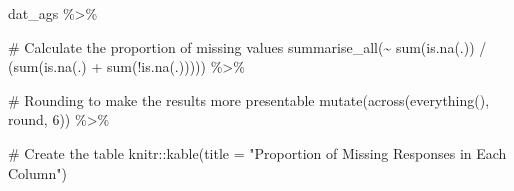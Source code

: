 \documentclass[
  letterpaper,
  DIV=11,
  numbers=noendperiod]{scrreprt}
\newenvironment{Shaded}{\begin{snugshade}}{\end{snugshade}}
\newcommand{\AttributeTok}[1]{\textcolor[rgb]{0.40,0.45,0.13}{#1}}
\newcommand{\CommentTok}[1]{\textcolor[rgb]{0.37,0.37,0.37}{#1}}
\newcommand{\DecValTok}[1]{\textcolor[rgb]{0.68,0.00,0.00}{#1}}
\newcommand{\FunctionTok}[1]{\textcolor[rgb]{0.28,0.35,0.67}{#1}}
\newcommand{\NormalTok}[1]{\textcolor[rgb]{0.00,0.23,0.31}{#1}}
\newcommand{\SpecialCharTok}[1]{\textcolor[rgb]{0.37,0.37,0.37}{#1}}
\newcommand{\StringTok}[1]{\textcolor[rgb]{0.13,0.47,0.30}{#1}}
\begin{document}
\begin{Shaded}
\begin{Highlighting}[]
\NormalTok{dat\_ags }\SpecialCharTok{\%\textgreater{}\%} 
  
  \CommentTok{\# Calculate the proportion of missing values }
  \FunctionTok{summarise\_all}\NormalTok{(}\SpecialCharTok{\textasciitilde{}} \FunctionTok{sum}\NormalTok{(}\FunctionTok{is.na}\NormalTok{(.)) }\SpecialCharTok{/}\NormalTok{ (}\FunctionTok{sum}\NormalTok{(}\FunctionTok{is.na}\NormalTok{(.) }\SpecialCharTok{+} \FunctionTok{sum}\NormalTok{(}\SpecialCharTok{!}\FunctionTok{is.na}\NormalTok{(.))))) }\SpecialCharTok{\%\textgreater{}\%} 
  
  \CommentTok{\# Rounding to make the results more presentable}
  \FunctionTok{mutate}\NormalTok{(}\FunctionTok{across}\NormalTok{(}\FunctionTok{everything}\NormalTok{(), round, }\DecValTok{6}\NormalTok{)) }\SpecialCharTok{\%\textgreater{}\%} 
  
  \CommentTok{\# Create the table}
\NormalTok{  knitr}\SpecialCharTok{::}\FunctionTok{kable}\NormalTok{(}\AttributeTok{title =} \StringTok{"Proportion of Missing Responses in Each Column"}\NormalTok{) }
\end{Highlighting}
\end{Shaded}
\end{document}
